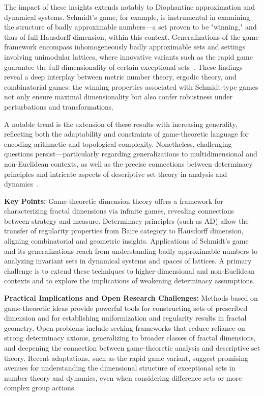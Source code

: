 \documentclass[sigconf]{acmart}
\begin{document}
The impact of these insights extends notably to Diophantine approximation and dynamical systems. Schmidt's game, for example, is instrumental in examining the structure of badly approximable numbers—a set proven to be "winning," and thus of full Hausdorff dimension, within this context. Generalizations of the game framework encompass inhomogeneously badly approximable sets and settings involving unimodular lattices, where innovative variants such as the rapid game guarantee the full dimensionality of certain exceptional sets~\cite{ref80}. These findings reveal a deep interplay between metric number theory, ergodic theory, and combinatorial games: the winning properties associated with Schmidt-type games not only ensure maximal dimensionality but also confer robustness under perturbations and transformations. 

A notable trend is the extension of these results with increasing generality, reflecting both the adaptability and constraints of game-theoretic language for encoding arithmetic and topological complexity. Nonetheless, challenging questions persist—particularly regarding generalizations to multidimensional and non-Euclidean contexts, as well as the precise connections between determinacy principles and intricate aspects of descriptive set theory in analysis and dynamics~\cite{ref80}.

\textbf{Key Points:}
Game-theoretic dimension theory offers a framework for characterizing fractal dimensions via infinite games, revealing connections between strategy and measure.
Determinacy principles (such as AD) allow the transfer of regularity properties from Baire category to Hausdorff dimension, aligning combinatorial and geometric insights.
Applications of Schmidt's game and its generalizations reach from understanding badly approximable numbers to analyzing invariant sets in dynamical systems and spaces of lattices.
A primary challenge is to extend these techniques to higher-dimensional and non-Euclidean contexts and to explore the implications of weakening determinacy assumptions.

\textbf{Practical Implications and Open Research Challenges:}
Methods based on game-theoretic ideas provide powerful tools for constructing sets of prescribed dimension and for establishing uniformization and regularity results in fractal geometry.
Open problems include seeking frameworks that reduce reliance on strong determinacy axioms, generalizing to broader classes of fractal dimensions, and deepening the connection between game-theoretic analysis and descriptive set theory.
Recent adaptations, such as the rapid game variant, suggest promising avenues for understanding the dimensional structure of exceptional sets in number theory and dynamics, even when considering difference sets or more complex group actions.
\end{document}

